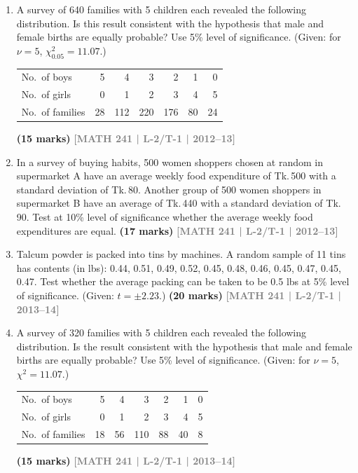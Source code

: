 \documentclass[12pt,a4paper]{article}
\newcommand{\yr}[1]{\hfill\textcolor{gray}{\small\textbf{[#1]}}}
\newcommand{\mk}[1]{\textcolor{orange!70!black}{\small\textbf{(#1 marks)}}}
\begin{document}
\begin{enumerate}
\item A survey of 640 families with 5 children each revealed the following distribution. Is this result consistent with the hypothesis that male and female births are equally probable? Use 5\% level of significance. (Given: for $\nu=5$, $\chi^{2}_{0.05}=11.07$.)
\begin{center}
\begin{tabular}{lrrrrrr}
\toprule
No.\ of boys  & 5  & 4   & 3   & 2   & 1  & 0  \\
No.\ of girls & 0  & 1   & 2   & 3   & 4  & 5  \\
\midrule
No.\ of families & 28 & 112 & 220 & 176 & 80 & 24 \\
\bottomrule
\end{tabular}
\end{center}
\mk{15} \yr{MATH 241 | L-2/T-1 | 2012--13}

\item In a survey of buying habits, 500 women shoppers chosen at random in supermarket A have an average weekly food expenditure of Tk.\,500 with a standard deviation of Tk.\,80. Another group of 500 women shoppers in supermarket B have an average of Tk.\,440 with a standard deviation of Tk.\,90. Test at 10\% level of significance whether the average weekly food expenditures are equal.
\mk{17} \yr{MATH 241 | L-2/T-1 | 2012--13}

\item Talcum powder is packed into tins by machines. A random sample of 11 tins has contents (in lbs): 0.44, 0.51, 0.49, 0.52, 0.45, 0.48, 0.46, 0.45, 0.47, 0.45, 0.47. Test whether the average packing can be taken to be 0.5 lbs at 5\% level of significance. (Given: $t=\pm2.23$.)
\mk{20} \yr{MATH 241 | L-2/T-1 | 2013--14}

\item A survey of 320 families with 5 children each revealed the following distribution. Is the result consistent with the hypothesis that male and female births are equally probable? Use 5\% level of significance. (Given: for $\nu=5$, $\chi^{2}=11.07$.)
\begin{center}
\begin{tabular}{lrrrrrr}
\toprule
No.\ of boys  & 5  & 4  & 3   & 2  & 1  & 0 \\
No.\ of girls & 0  & 1  & 2   & 3  & 4  & 5 \\
\midrule
No.\ of families & 18 & 56 & 110 & 88 & 40 & 8 \\
\bottomrule
\end{tabular}
\end{center}
\mk{15} \yr{MATH 241 | L-2/T-1 | 2013--14}


\end{enumerate}
\end{document}
